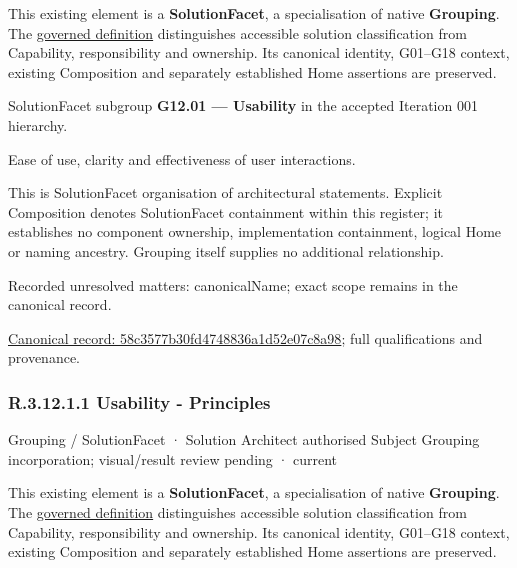 This existing element is a \textbf{SolutionFacet}, a specialisation of native
\textbf{Grouping}. The \href{\detokenize{../../../../../../../governance/continuum-representation.md#solutionfacet-classification--1119-candidate}}{governed definition}
distinguishes accessible solution classification from Capability, responsibility
and ownership. Its canonical identity, G01–G18 context, existing Composition
and separately established Home assertions are preserved.



SolutionFacet subgroup \textbf{G12.01 — Usability} in the accepted Iteration 001 hierarchy.



Ease of use, clarity and effectiveness of user interactions.



This is SolutionFacet organisation of architectural statements. Explicit Composition denotes SolutionFacet containment within this register; it establishes no component ownership, implementation containment, logical Home or naming ancestry. Grouping itself supplies no additional relationship.


{\small Recorded unresolved matters: canonicalName; exact scope remains in the canonical record.}\par
{\footnotesize \href{../../../../../../../continuum/grouping/58c3577b30fd4748836a1d52e07c8a98.md}{Canonical record: 58c3577b30fd4748836a1d52e07c8a98}; full qualifications and provenance.}\par
\subsubsection*{R.3.12.1.1 Usability - Principles}
\label{navigation:R.3.12.1.1}

\label{element:493e4a05fe76496f82caf26e68f15edd}
{\small Grouping / SolutionFacet · Solution Architect authorised Subject Grouping incorporation; visual/result review pending · current}\par

This existing element is a \textbf{SolutionFacet}, a specialisation of native
\textbf{Grouping}. The \href{\detokenize{../../../../../../../governance/continuum-representation.md#solutionfacet-classification--1119-candidate}}{governed definition}
distinguishes accessible solution classification from Capability, responsibility
and ownership. Its canonical identity, G01–G18 context, existing Composition
and separately established Home assertions are preserved.



